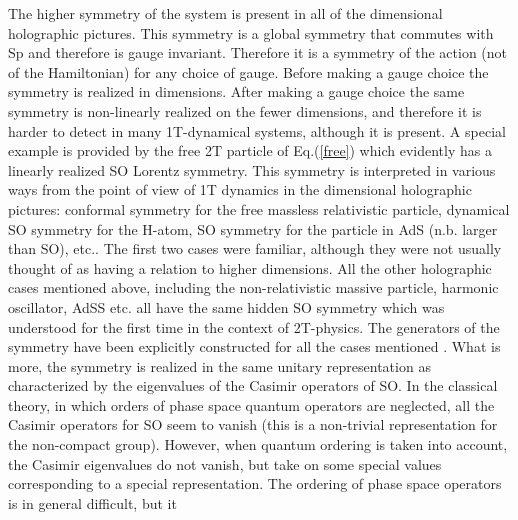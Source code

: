 \documentclass[a4paper,12pt]{article}
\begin{document}
The higher symmetry of the \coordHE{} system is present in all of the
\coordHE{} dimensional holographic pictures. This symmetry is a global
symmetry that commutes with Sp\coordHE{} and therefore
is gauge invariant. Therefore it is a symmetry of the action (not
of the Hamiltonian) for any choice of gauge. Before making a gauge
choice the symmetry is realized in \coordHE{} dimensions. After making
a gauge choice the same symmetry is non-linearly realized on the
fewer \coordHE{} dimensions, and therefore it is harder to detect in many
1T-dynamical systems, although it is present. A special example is
provided by the free 2T particle of Eq.(\ref{free}) which
evidently has a linearly realized SO\coordHE{} Lorentz
symmetry. This symmetry is interpreted in various ways from the
point of view of 1T dynamics in the \coordHE{} dimensional holographic
pictures: conformal symmetry for the free massless relativistic
particle, dynamical SO\coordHE{} symmetry for the
H-atom, SO\coordHE{} symmetry for the particle in
AdS\coordHE{} (n.b. larger than SO\coordHE{}), etc.. The
first two cases were familiar, although they were not usually
thought of as having a relation to higher dimensions. All the
other holographic cases mentioned above, including the
non-relativistic massive particle, harmonic oscillator,
AdS\coordHE{}S\coordHE{} etc. all have the same hidden SO\coordHE{} symmetry which was understood for the first time in
the context of 2T-physics. The generators of the symmetry have
been explicitly constructed for all the cases mentioned
\cite{old2T}. What is more, the symmetry is realized in the same
unitary representation as characterized by the eigenvalues of the
Casimir operators of SO\coordHE{}. In the classical
theory, in which orders of phase space quantum operators are
neglected, all the Casimir operators for SO\coordHE{}
seem to vanish (this is a non-trivial representation for the
non-compact group). However, when quantum ordering is taken into
account, the Casimir eigenvalues do not vanish, but take on some
special values corresponding to a special representation. The
ordering of phase space operators is in general difficult, but it
\end{document}
